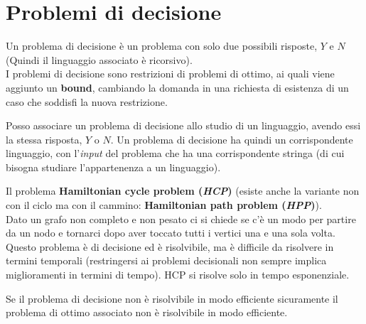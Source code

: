 \section{Problemi di decisione}
\begin{definizione}
  Un problema di decisione è un problema con solo due possibili risposte, $Y$ e
  $N$ (Quindi il linguaggio associato è ricorsivo).\\
  I problemi di decisione sono restrizioni di problemi di ottimo, ai quali viene
  aggiunto un \textbf{bound}, cambiando la domanda in una richiesta di esistenza
  di un caso che soddisfi la nuova restrizione.
\end{definizione}
\begin{definizione}
  Posso associare un problema di decisione allo studio di un linguaggio, avendo
essi la stessa risposta, $Y$ o $N$. Un problema di decisione ha quindi un
corrispondente linguaggio, con l'\textit{input} del problema che ha una corrispondente
stringa (di cui bisogna studiare l'appartenenza a un linguaggio).
\end{definizione}
\begin{esempio}
  Il problema \textbf{Hamiltonian cycle problem (\textit{HCP})} (esiste anche la
  variante non con il ciclo ma con il cammino: \textbf{Hamiltonian path problem
    (\textit{HPP})}).\\ 
  Dato un grafo non completo e non pesato ci si chiede se c'è un modo per
  partire da un nodo e tornarci dopo aver toccato tutti i vertici una e una sola
  volta.\\
  Questo problema è di decisione ed è risolvibile, ma è difficile da risolvere
  in termini temporali (restringersi ai problemi decisionali non sempre implica
  miglioramenti in termini di tempo). HCP si risolve solo in tempo esponenziale.
\end{esempio}
\begin{definizione}
  Se il problema di decisione non è risolvibile in modo efficiente sicuramente
  il problema di ottimo associato non è risolvibile in modo efficiente.
\end{definizione}
